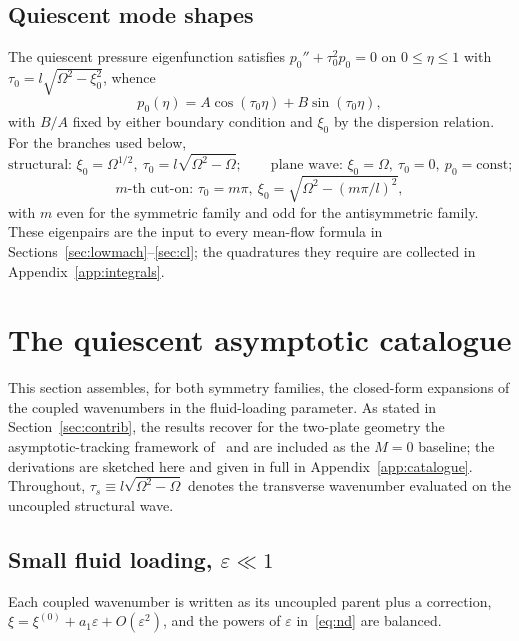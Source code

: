 \documentclass[11pt,a4paper]{article}
\newcommand{\Om}{\Omega}
\newcommand{\eps}{\varepsilon}
\theoremstyle{plain}
\theoremstyle{remark}
\begin{document}
\subsection{Quiescent mode shapes}
The quiescent pressure eigenfunction satisfies $p_0''+\tau_0^2p_0=0$ on $0\le\eta\le1$ with
$\tau_0=l\sqrt{\Om^2-\xi_0^2}$, whence
\begin{equation}
p_0(\eta)=A\cos(\tau_0\eta)+B\sin(\tau_0\eta),
\label{eq:p0}
\end{equation}
with $B/A$ fixed by either boundary condition and $\xi_0$ by the dispersion relation. For the branches
used below,
\begin{equation}
\text{structural: }\xi_0=\Om^{1/2},\ \tau_0=l\sqrt{\Om^2-\Om};\qquad
\text{plane wave: }\xi_0=\Om,\ \tau_0=0,\ p_0=\text{const};
\end{equation}
\begin{equation}
\text{$m$-th cut-on: }\tau_0=m\pi,\ \xi_0=\sqrt{\Om^2-(m\pi/l)^2},
\end{equation}
with $m$ even for the symmetric family and odd for the antisymmetric family. These eigenpairs are the
input to every mean-flow formula in Sections~\ref{sec:lowmach}--\ref{sec:cl}; the quadratures they
require are collected in Appendix~\ref{app:integrals}.

\section{The quiescent asymptotic catalogue}\label{sec:catalogue}

This section assembles, for both symmetry families, the closed-form expansions of the coupled
wavenumbers in the fluid-loading parameter. As stated in Section~\ref{sec:contrib}, the results
recover for the two-plate geometry the asymptotic-tracking framework
of~\cite{sarkarsonti,kunte2011,prakash2016} and are included as the $M=0$ baseline; the derivations are
sketched here and given in full in Appendix~\ref{app:catalogue}. Throughout,
$\tau_s\equiv l\sqrt{\Om^2-\Om}$ denotes the transverse wavenumber evaluated on the uncoupled
structural wave.

\subsection{Small fluid loading, $\eps\ll1$}
Each coupled wavenumber is written as its uncoupled parent plus a correction,
$\xi=\xi^{(0)}+a_1\eps+O(\eps^2)$, and the powers of $\eps$ in~\eqref{eq:nd} are balanced.
\end{document}
